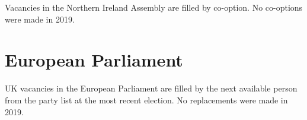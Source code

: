 Vacancies in the Northern Ireland Assembly are filled by co-option.
No co-options were made in 2019.
%

\section{European Parliament}

UK vacancies in the European Parliament are filled by the next available person from the party list at the most recent election.
No replacements were made in 2019.


